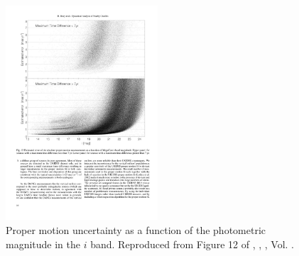 \begin{figure}[ht!]
\begin{center}
\includegraphics[height=8cm]{background/Figures/F12_Bouy2013.pdf}
\caption{Proper motion uncertainty as a function of the photometric magnitude in the $i$ band. Reproduced from Figure 12 of \citet{Bouy2013}, \textit{}, , Vol. .}
\label{fig:pmuncert}
\end{center}
\end{figure}

